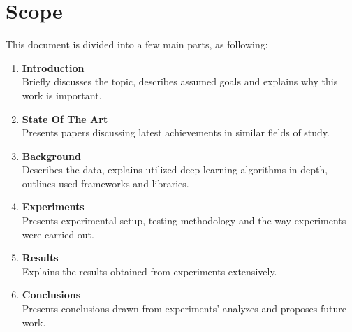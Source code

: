 \section{Scope}

\quad This document is divided into a few main parts, as following:
\begin{enumerate}
	\item \textbf{Introduction}
	\\Briefly discusses the topic, describes assumed goals and explains why this work is important.
	\item \textbf{State Of The Art}
	\\Presents papers discussing latest achievements in similar fields of study. 
	\item \textbf{Background}
	\\Describes the data, explains utilized deep learning algorithms in depth, outlines used frameworks and libraries.
	\item \textbf{Experiments}
	\\Presents experimental setup, testing methodology and the way experiments were carried out.
	\item \textbf{Results}
	\\Explains the results obtained from experiments extensively. 
	\item \textbf{Conclusions}
	\\Presents conclusions drawn from experiments' analyzes and proposes future work.
\end{enumerate}







